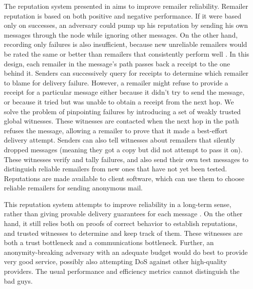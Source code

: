 \documentclass[times,10pt,twocolumn]{article}
\begin{document}
The reputation system presented in \cite{mix-acc} aims to improve
remailer reliability. Remailer reputation is based on both positive and
negative performance. If it were based only on successes, an adversary
could pump up his reputation by sending his own messages through the
node while ignoring other messages. On the other hand, recording only
failures is also insufficient, because new unreliable remailers would be
rated the same or better than remailers that consistently perform well
\cite{cheap-pseudonyms}. In this design, each remailer in the message's
path passes back a receipt to the one behind it. Senders can successively
query for receipts to determine which remailer to blame for delivery
failure. However, a remailer might refuse to provide a receipt for a
particular message either because it didn't try to send the message, or
because it tried but was unable to obtain a receipt from the next hop. We
solve the problem of pinpointing failures by introducing a set of weakly
trusted global witnesses. These witnesses are contacted when the next
hop in the path refuses the message, allowing a remailer to prove that it
made a best-effort delivery attempt. Senders can also tell witnesses about
remailers that silently dropped messages (meaning they got a copy but did
not attempt to pass it on). These witnesses verify and tally failures, and
also send their own test messages to distinguish reliable remailers from
new ones that have not yet been tested. Reputations are %
made available to client software, which can use them to choose reliable
remailers for sending anonymous mail.

This reputation system attempts to improve reliability in a long-term
sense, rather than giving provable delivery guarantees for each
message \cite{shuffle}.
On the other hand, it still relies both on proofs of correct behavior
to establish reputations, and trusted witnesses to determine and
keep track of them. These witnesses are both a trust bottleneck and a
communications bottleneck. Further, an anonymity-breaking adversary with
an adequate budget would do best to provide very good service, possibly
also attempting DoS against other high-quality providers. The
usual performance and efficiency metrics cannot distinguish the bad guys.
\end{document}
